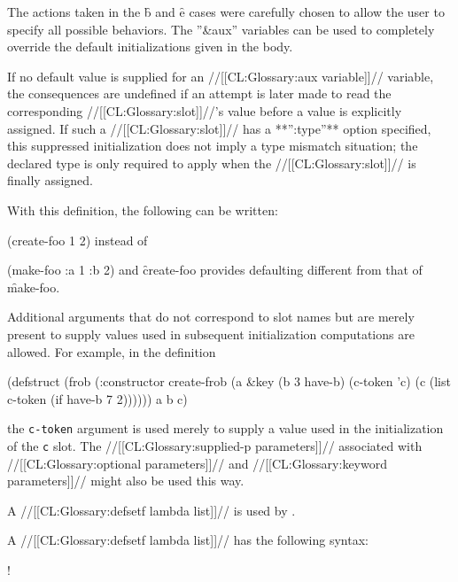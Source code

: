 The actions taken in the \f{b} and \f{e} cases were carefully
chosen to allow the user to specify all possible behaviors. 
The ''&aux'' variables can be used to completely override the default
initializations given in the body.

If no default value is supplied for an //[[CL:Glossary:aux variable]]// variable,
the consequences are undefined if an attempt is later made to read
the corresponding //[[CL:Glossary:slot]]//'s value before a value is explicitly assigned.
If such a //[[CL:Glossary:slot]]// has a **'':type''** option specified,
this suppressed initialization does not imply a type mismatch situation;
the declared type is only required to apply when the //[[CL:Glossary:slot]]// is finally assigned.



With this definition, the following can be written:

\code
 (create-foo 1 2)
\endcode
instead of

\code
 (make-foo :a 1 :b 2)
\endcode
and \f{create-foo} provides defaulting different
from that of \f{make-foo}.

Additional arguments that do not correspond to slot names but
are merely present to supply values used in subsequent initialization 
computations are allowed.
For example, in the definition

\code
 (defstruct (frob (:constructor create-frob
                  (a &key (b 3 have-b) (c-token 'c) 
                          (c (list c-token (if have-b 7 2))))))
         a b c)
\endcode
 
the {\tt c-token} argument is used merely to supply a value used in the 
initialization of the {\tt c} slot. The //[[CL:Glossary:supplied-p parameters]]// 
associated with //[[CL:Glossary:optional parameters]]// and //[[CL:Glossary:keyword parameters]]//
might also be used this way.
 


\endsubsection%


A //[[CL:Glossary:defsetf lambda list]]// is used by .

A //[[CL:Glossary:defsetf lambda list]]// has the following syntax:



\Vskip 1pc!

